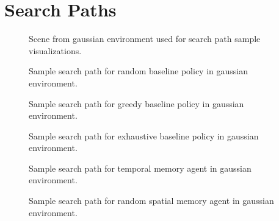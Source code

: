 \chapter{Search Paths}
\label{app:paths}

\begin{figure}
    
    \label{fig:path-scene}
    \caption[Scene for search paths]{Scene from gaussian environment used for search path sample visualizations.}
\end{figure}    

\begin{figure}
    
    \label{fig:path-random}
    \caption[Random baseline search path]{Sample search path for random baseline policy in gaussian environment.}
\end{figure}

\begin{figure}
    
    \label{fig:path-greedy}
    \caption[Random baseline search path]{Sample search path for greedy baseline policy in gaussian environment.}
\end{figure}

\begin{figure}
    
    \label{fig:path-exhaustive}
    \caption[Random baseline search path]{Sample search path for exhaustive baseline policy in gaussian environment.}
\end{figure}

\begin{figure}
    
    \label{fig:path-lstm}
    \caption[Temporal memory agent search path]{Sample search path for temporal memory agent in gaussian environment.}
\end{figure}

\begin{figure}
    
    \label{fig:path-map}
    \caption[Spatial memory agent search path]{Sample search path for random spatial memory agent in gaussian environment.}
\end{figure}